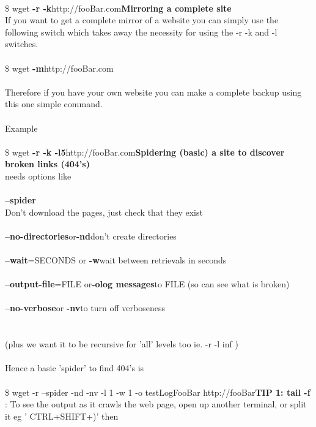 \documentclass[10pt,a4paper]{article}
\begin{document}
{\\
\$ wget \textbf{-r -k}}{\large http://fooBar.com}{\large \textbf{Mirroring a complete site}}{\large \\
If you want to get a complete mirror of a website you can simply use the following switch which takes away the necessity for using the -r -k and -l switches.\\
\\
\$ wget \textbf{-m}}{\large http://fooBar.com}{\large \\
\\
Therefore if you have your own website you can make a complete backup using this one simple command.\\
\\
Example\\
\\
\$ wget \textbf{-r -k -l5}}{\large http://fooBar.com}{\large \textbf{Spidering (basic) a site to discover broken links (404's)}}{\large {\large \\
needs options like\\
\\
\textbf{--spider}}{\large {\large \\
Don't download the pages, just check that they exist\\
\\
\textbf{--no-directories}}{\large  or\textbf{-nd}}{\large {\large     don't create directories\\
\\
\textbf{--wait}}{\large =SECONDS or \textbf{-w}}{\large {\large     wait between retrievals in seconds\\
\\
\textbf{--output-file}}{\large =FILE or\textbf{-o}}{\large {\large \textbf{log messages}}{\large  to FILE (so can see what is broken)\\
\\
\textbf{--no-verbose}}{\large  or \textbf{-nv}}{\large {\large   to turn off verboseness\\
\\
\\
(plus we want it to be recursive for 'all' levels too ie. -r -l inf )\\
\\
Hence a basic 'spider' to find 404's is\\
\\
\$ wget -r --spider -nd -nv -l 1 -w 1 -o testLogFooBar http://fooBar}{\large \textbf{TIP 1: tail -f}}{\large {\large \\
: To see the output as it crawls the web page, open up another terminal, or split it eg ' CTRL+SHIFT+)' then \\
}}}}}}}}
\end{document}
